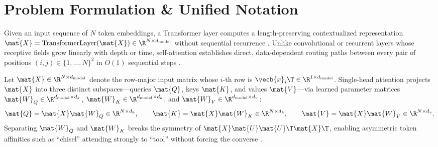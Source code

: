 \documentclass[../../../../master.tex]{subfiles}
\begin{document}
\sloppy\setlength{\emergencystretch}{3em}

\section{Problem Formulation \& Unified Notation}
\label{sec:attn:formulation}

Given an input sequence of $N$ token embeddings, a Transformer layer computes a length-preserving contextualized representation $\tilde{\mat{X}} = \mathrm{TransformerLayer}(\mat{X}) \in \R^{N \times d_{\mathrm{model}}}$ without sequential recurrence . Unlike convolutional or recurrent layers whose receptive fields grow linearly with depth or time, self-attention establishes direct, data-dependent routing paths between every pair of positions $(i, j) \in \{1, \dots, N\}^2$ in $O(1)$ sequential steps .

Let $\mat{X} \in \R^{N \times d_{\mathrm{model}}}$ denote the row-major input matrix whose $i$-th row is $\vecb{x}_i\T \in \R^{1 \times d_{\mathrm{model}}}$. Single-head attention projects $\mat{X}$ into three distinct subspaces---queries $\mat{Q}$, keys $\mat{K}$, and values $\mat{V}$---via learned parameter matrices $\mat{W}_Q \in \R^{d_{\mathrm{model}} \times d_k}$, $\mat{W}_K \in \R^{d_{\mathrm{model}} \times d_k}$, and $\mat{W}_V \in \R^{d_{\mathrm{model}} \times d_v}$:
\begin{equation}
  \mat{Q} = \mat{X}\mat{W}_Q \in \R^{N \times d_k}, \qquad
  \mat{K} = \mat{X}\mat{W}_K \in \R^{N \times d_k}, \qquad
  \mat{V} = \mat{X}\mat{W}_V \in \R^{N \times d_v}.
  \label{eq:attn:qkv_proj}
\end{equation}
Separating $\mat{W}_Q$ and $\mat{W}_K$ breaks the symmetry of $\mat{X}\mat{U}\mat{U}\T\mat{X}\T$, enabling asymmetric token affinities such as ``chisel'' attending strongly to ``tool'' without forcing the converse .
\end{document}
